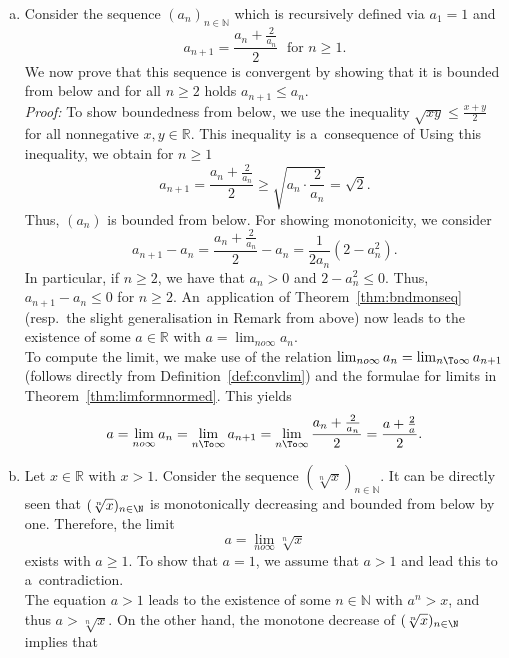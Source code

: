 \begin{example}{}\label{ex:monseqconv}
 \begin{enumerate}[a)]
  \item Consider the sequence $(a_n)_{n\in\mathbb{N}}$ which is recursively defined via $a_1=1$ and 
  \[a_{n+1}=\frac{a_n+\frac2{a_n}}{2}\;\text{  for $n\geq 1$.}\] 
  We now prove that this sequence is convergent by showing that
it is bounded from below and for all $n\geq2$ holds $a_{n+1}\leq a_n$.\\[2ex]
{\em Proof:} To show boundedness from below, we use the inequality $\sqrt{xy}\leq\frac{x+y}2$ for all nonnegative $x,y\in\mathbb{R}$. This inequality is a~consequence of
Using this inequality, we obtain for $n\geq1$
\[a_{n+1}=\frac{a_n+\frac{2}{a_n}}{2}\geq \sqrt{a_n\cdot\frac2{a_n}}=\sqrt{2}.\]
Thus, $(a_n)$ is bounded from below. For showing monotonicity, we consider
\[a_{n+1}-a_n=\frac{a_n+\frac2{a_n}}{2}-a_n=\frac{1}{2a_n}(2-a_n^2).\]
In particular, if $n\geq2$, we have that $a_n>0$ and $2-a_n^2\leq0$. Thus, $a_{n+1}-a_n\leq0$ for $n\geq2$. An~application of Theorem~\ref{thm:bndmonseq} (resp.\ the slight generalisation in Remark %
from above) 
now leads to the existence of some $a\in\mathbb{R}$ with $a=\lim_{n	o\infty}a_n$.\\[2ex]
To compute the limit, we make use of the relation $\lim_{n	o\infty}a_n=\lim_{n\To\infty}a_{n+1}$ (follows directly from Definition~\ref{def:convlim}) and the formulae for limits in Theorem~\ref{thm:limformnormed}. This yields
\[a=\lim_{n	o\infty}a_n=\lim_{n\To\infty}a_{n+1}=\lim_{n\To\infty}\frac{a_n+\frac2{a_n}}{2}=\frac{a+\frac2{a}}{2}.\]
\item Let $x\in\mathbb{R}$ with $x>1$. Consider the sequence $(\sqrt[n]{x})_{n\in\mathbb{N}}$. It can be directly seen that $(\sqrt[n]{x})_{n\in\N}$ is monotonically decreasing and bounded from below by one. Therefore, the limit
\[a=\lim_{n	o\infty}\sqrt[n]{x}\]
exists with $a\geq1$. To show that $a=1$, we assume that $a>1$ and lead this to a~contradiction.\\
The equation $a>1$ leads to the existence of some $n\in\mathbb{N}$ with $a^n>x$, and thus $a>\sqrt[n]{x}$. On the other hand, the monotone decrease of $(\sqrt[n]{x})_{n\in\N}$ implies that

\end{enumerate}
\end{example}
